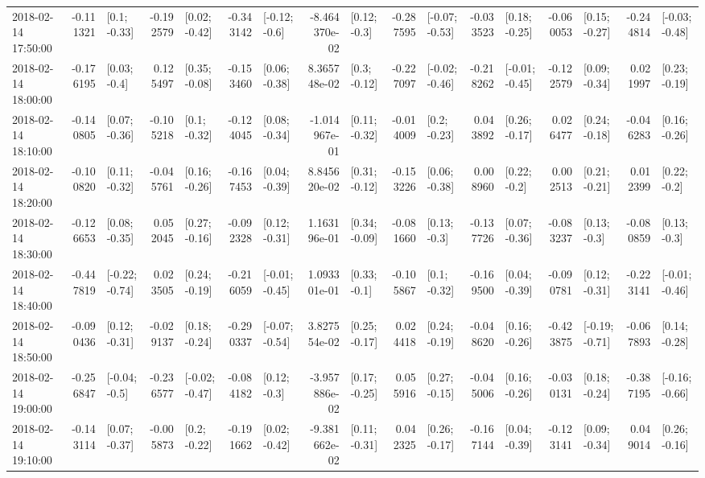 \begin{tabular}{lrlrlrlrlrlrlrlrl}
2018-02-14 17:50:00 & -0.111321 &    [0.1; -0.33] & -0.192579 &   [0.02; -0.42] & -0.343142 &   [-0.12; -0.6] & -8.464370e-02 &    [0.12; -0.3] & -0.287595 &  [-0.07; -0.53] & -0.033523 &   [0.18; -0.25] & -0.060053 &   [0.15; -0.27] & -0.244814 &  [-0.03; -0.48] \\
2018-02-14 18:00:00 & -0.176195 &    [0.03; -0.4] &  0.125497 &   [0.35; -0.08] & -0.153460 &   [0.06; -0.38] &  8.365748e-02 &    [0.3; -0.12] & -0.227097 &  [-0.02; -0.46] & -0.218262 &  [-0.01; -0.45] & -0.122579 &   [0.09; -0.34] &  0.021997 &   [0.23; -0.19] \\
2018-02-14 18:10:00 & -0.140805 &   [0.07; -0.36] & -0.105218 &    [0.1; -0.32] & -0.124045 &   [0.08; -0.34] & -1.014967e-01 &   [0.11; -0.32] & -0.014009 &    [0.2; -0.23] &  0.043892 &   [0.26; -0.17] &  0.026477 &   [0.24; -0.18] & -0.046283 &   [0.16; -0.26] \\
2018-02-14 18:20:00 & -0.100820 &   [0.11; -0.32] & -0.045761 &   [0.16; -0.26] & -0.167453 &   [0.04; -0.39] &  8.845620e-02 &   [0.31; -0.12] & -0.153226 &   [0.06; -0.38] &  0.008960 &    [0.22; -0.2] &  0.002513 &   [0.21; -0.21] &  0.012399 &    [0.22; -0.2] \\
2018-02-14 18:30:00 & -0.126653 &   [0.08; -0.35] &  0.052045 &   [0.27; -0.16] & -0.092328 &   [0.12; -0.31] &  1.163196e-01 &   [0.34; -0.09] & -0.081660 &    [0.13; -0.3] & -0.137726 &   [0.07; -0.36] & -0.083237 &    [0.13; -0.3] & -0.080859 &    [0.13; -0.3] \\
2018-02-14 18:40:00 & -0.447819 &  [-0.22; -0.74] &  0.023505 &   [0.24; -0.19] & -0.216059 &  [-0.01; -0.45] &  1.093301e-01 &    [0.33; -0.1] & -0.105867 &    [0.1; -0.32] & -0.169500 &   [0.04; -0.39] & -0.090781 &   [0.12; -0.31] & -0.223141 &  [-0.01; -0.46] \\
2018-02-14 18:50:00 & -0.090436 &   [0.12; -0.31] & -0.029137 &   [0.18; -0.24] & -0.290337 &  [-0.07; -0.54] &  3.827554e-02 &   [0.25; -0.17] &  0.024418 &   [0.24; -0.19] & -0.048620 &   [0.16; -0.26] & -0.423875 &  [-0.19; -0.71] & -0.067893 &   [0.14; -0.28] \\
2018-02-14 19:00:00 & -0.256847 &   [-0.04; -0.5] & -0.236577 &  [-0.02; -0.47] & -0.084182 &    [0.12; -0.3] & -3.957886e-02 &   [0.17; -0.25] &  0.055916 &   [0.27; -0.15] & -0.045006 &   [0.16; -0.26] & -0.030131 &   [0.18; -0.24] & -0.387195 &  [-0.16; -0.66] \\
2018-02-14 19:10:00 & -0.143114 &   [0.07; -0.37] & -0.005873 &    [0.2; -0.22] & -0.191662 &   [0.02; -0.42] & -9.381662e-02 &   [0.11; -0.31] &  0.042325 &   [0.26; -0.17] & -0.167144 &   [0.04; -0.39] & -0.123141 &   [0.09; -0.34] &  0.049014 &   [0.26; -0.16] \\

\end{tabular}
